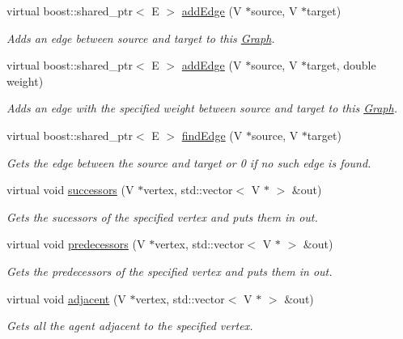 \begin{DoxyCompactItemize}
\item 
virtual boost\-::shared\-\_\-ptr$<$ E $>$ \hyperlink{classrepast_1_1_graph_a7ce027bc5e1c0119f9cce87aadf49bb7}{add\-Edge} (V $\ast$source, V $\ast$target)
\begin{DoxyCompactList}\small\item\em Adds an edge between source and target to this \hyperlink{classrepast_1_1_graph}{Graph}. \end{DoxyCompactList}\item 
virtual boost\-::shared\-\_\-ptr$<$ E $>$ \hyperlink{classrepast_1_1_graph_a9cc7843398086080c064123aaf245dd5}{add\-Edge} (V $\ast$source, V $\ast$target, double weight)
\begin{DoxyCompactList}\small\item\em Adds an edge with the specified weight between source and target to this \hyperlink{classrepast_1_1_graph}{Graph}. \end{DoxyCompactList}\item 
virtual boost\-::shared\-\_\-ptr$<$ E $>$ \hyperlink{classrepast_1_1_graph_a160050d2b0ce64a59b32c2697ddd622b}{find\-Edge} (V $\ast$source, V $\ast$target)
\begin{DoxyCompactList}\small\item\em Gets the edge between the source and target or 0 if no such edge is found. \end{DoxyCompactList}\item 
virtual void \hyperlink{classrepast_1_1_graph_a9d6eb280c2a2034f127453c5f965d61e}{successors} (V $\ast$vertex, std\-::vector$<$ V $\ast$ $>$ \&out)
\begin{DoxyCompactList}\small\item\em Gets the sucessors of the specified vertex and puts them in out. \end{DoxyCompactList}\item 
virtual void \hyperlink{classrepast_1_1_graph_a9686c8fee74dbcb6b5bd0ddc9cc82827}{predecessors} (V $\ast$vertex, std\-::vector$<$ V $\ast$ $>$ \&out)
\begin{DoxyCompactList}\small\item\em Gets the predecessors of the specified vertex and puts them in out. \end{DoxyCompactList}\item 
virtual void \hyperlink{classrepast_1_1_graph_ac07ec9433947d5c677786e37e4cb0973}{adjacent} (V $\ast$vertex, std\-::vector$<$ V $\ast$ $>$ \&out)
\begin{DoxyCompactList}\small\item\em Gets all the agent adjacent to the specified vertex. \end{DoxyCompactList}\item 

\end{DoxyCompactItemize}

